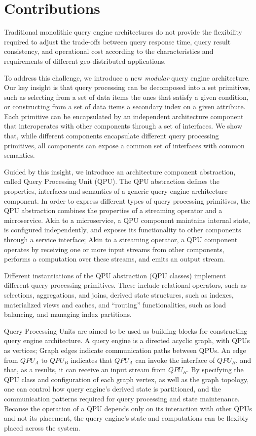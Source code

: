 \section{Contributions}

Traditional monolithic query engine architectures do not provide the flexibility required to adjust the trade-offs
between query response time, query result consistency, and operational cost according to the characteristics and
requirements of different geo-distributed applications.

To address this challenge, we introduce a new \textit{modular} query engine architecture.
Our key insight is that query processing can be decomposed into a set primitives,
such as selecting from a set of data items the ones that satisfy a given condition,
or constructing from a set of data items a secondary index on a given attribute.
Each primitive can be encapsulated by an independent architecture component that interoperates with other components through a set of interfaces.
We show that, while different components encapsulate different query processing primitives,
all components can expose a common set of interfaces with common semantics.

Guided by this insight,
we introduce an architecture component abstraction, called Query Processing Unit (QPU).
The QPU abstraction defines the properties, interfaces and semantics of a generic query engine architecture component.
In order to express different types of query processing primitives,
the QPU abstraction combines the properties of a streaming operator and a microservice.
Akin to a microservice, a QPU component maintains internal state, is configured independently, and exposes its functionality to other components through a service interface;
Akin to a streaming operator, a QPU component operates by receiving one or more input streams from other components,
performs a computation over these streams, and emits an output stream.

Different instantiations of the QPU abstraction (QPU classes) implement different query processing primitives.
These include relational operators, such as selections, aggregations, and joins,
derived state structures, such as indexes, materialized views and caches,
and ``routing'' functionalities, such as load balancing, and managing index partitions.

Query Processing Units are aimed to be used as building blocks for constructing query engine architecture.
A query engine is a directed acyclic graph, with QPUs as vertices;
Graph edges indicate communication paths between QPUs.
An edge from $QPU_A$ to $QPU_B$ indicates that $QPU_A$ can invoke the interface of $QPU_B$,
and that, as a results, it can receive an input stream from $QPU_B$.
By specifying the QPU class and configuration of each graph vertex, as well as the graph topology,
one can control how query engine's derived state is partitioned,
and the communication patterns required for query processing and state maintenance.
Because the operation of a QPU depends only on its interaction with other QPUs and not its placement,
the query engine's state and computations can be flexibly placed across the system.

